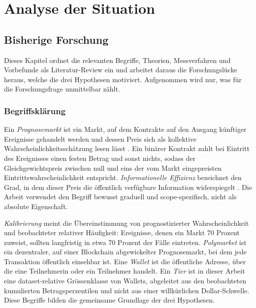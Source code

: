 \chapter{Analyse der Situation}
\label{ch:analyse}

\section{Bisherige Forschung}
\label{ch:theorie}

Dieses Kapitel ordnet die relevanten Begriffe, Theorien, Messverfahren und Vorbefunde als Literatur-Review ein und arbeitet daraus die Forschungslücke heraus, welche die drei Hypothesen motiviert. Aufgenommen wird nur, was für die Forschungsfrage unmittelbar zählt.

\subsection{Begriffsklärung}
Ein \emph{Prognosemarkt} ist ein Markt, auf dem Kontrakte auf den Ausgang
künftiger Ereignisse gehandelt werden und dessen Preis sich als kollektive
Wahrscheinlichkeitsschätzung lesen lässt \citep{zotero_poly_005}. Ein binärer
Kontrakt zahlt bei Eintritt des Ereignisses einen festen Betrag und sonst nichts,
sodass der Gleichgewichtspreis zwischen null und eins der vom Markt
eingepreisten Eintrittswahrscheinlichkeit entspricht. \emph{Informationelle
Effizienz} bezeichnet den Grad, in dem dieser Preis die öffentlich verfügbare
Information widerspiegelt \citep{lit_emh_001}. Die Arbeit verwendet den Begriff
bewusst graduell und scope-spezifisch, nicht als absolute Eigenschaft.

\emph{Kalibrierung} meint die Übereinstimmung von prognostizierter
Wahrscheinlichkeit und beobachteter relativer Häufigkeit: Ereignisse, denen ein
Markt 70 Prozent zuweist, sollten langfristig in etwa 70 Prozent der Fälle
eintreten. \emph{Polymarket} ist ein dezentraler, auf einer Blockchain
abgewickelter Prognosemarkt, bei dem jede Transaktion öffentlich einsehbar ist.
Eine \emph{Wallet} ist die öffentliche Adresse, über die eine Teilnehmerin oder
ein Teilnehmer handelt. Ein \emph{Tier} ist in dieser Arbeit eine
dataset-relative Grössenklasse von Wallets, abgeleitet aus den beobachteten
kumulierten Betragsperzentilen und nicht aus einer willkürlichen
Dollar-Schwelle. Diese Begriffe bilden die gemeinsame Grundlage der drei
Hypothesen.

